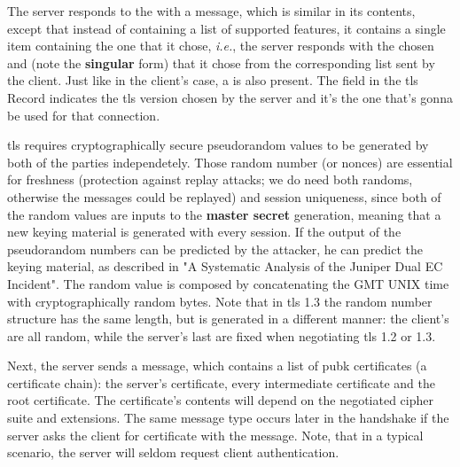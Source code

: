 \documentclass{llncs}
\begin{document}
The server responds to the  with a 
message, which is similar in its contents, except that instead of containing
a list of supported features, it contains a single item containing the one that it chose,
\textit{i.e.}, the server responds with the chosen  and
 (note the \textbf{singular} form) that it chose from the
corresponding list sent by the client. Just like in the client's case, a 
is also present. The  field in the \gls{tls} Record indicates
the \gls{tls} version chosen by the server and it's the one that's gonna be
used for that connection.

\gls{tls} requires cryptographically secure pseudorandom values to be generated
by both of the parties independetely. Those random number (or nonces) are essential for freshness
(protection against replay attacks; we do need both randoms, otherwise the messages could
be replayed) and session uniqueness, since both of
the random values are inputs to the \textbf{master secret} generation, meaning
that a new keying material is generated with every session. If the output of the pseudorandom numbers
can be predicted by the attacker, he can predict the keying material, as described
in "A Systematic Analysis of the Juniper Dual EC Incident"\cite{DualECJu15:online}.
The  random value is composed by concatenating the 
GMT UNIX time with  cryptographically random bytes. Note that in \gls{tls} 1.3
the random number structure has the same length, but is generated in a different manner:
the client's  are all random, while the server's last 
are fixed when negotiating \gls{tls} 1.2 or 1.3.

Next, the server sends a  message, which contains a list
of \gls{pubk} certificates (a certificate chain): the server's certificate,
every intermediate certificate and the root certificate. The certificate's contents
will depend on the negotiated cipher suite and extensions.
The same message type occurs later in the handshake if the server asks the client for certificate with the
 message. Note, that in a typical scenario, the
server will seldom request client authentication.
\end{document}
